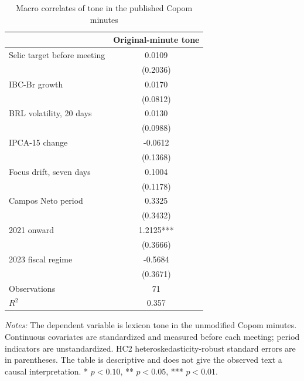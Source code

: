 \begin{table}[htbp]
\color{revisionred}
\centering
\begin{threeparttable}
\caption{Macro correlates of tone in the published Copom minutes}
\label{tab:macro-tone-correlates}
\begin{footnotesize}
\begin{tabular}{lc}
\toprule
 & Original-minute tone \\
\midrule
Selic target before meeting & 0.0109 \\
 & (0.2036) \\
IBC-Br growth & 0.0170 \\
 & (0.0812) \\
BRL volatility, 20 days & 0.0130 \\
 & (0.0988) \\
IPCA-15 change & -0.0612 \\
 & (0.1368) \\
Focus drift, seven days & 0.1004 \\
 & (0.1178) \\
Campos Neto period & 0.3325 \\
 & (0.3432) \\
2021 onward & 1.2125*** \\
 & (0.3666) \\
2023 fiscal regime & -0.5684 \\
 & (0.3671) \\
\midrule
Observations & 71 \\
$R^2$ & 0.357 \\
\bottomrule
\end{tabular}
\begin{tablenotes}[flushleft]
\scriptsize
\item \textit{Notes:} The dependent variable is lexicon tone in the unmodified Copom minutes. Continuous covariates are standardized and measured before each meeting; period indicators are unstandardized. HC2 heteroskedasticity-robust standard errors are in parentheses. The table is descriptive and does not give the observed text a causal interpretation. * $p<0.10$, ** $p<0.05$, *** $p<0.01$.
\end{tablenotes}
\end{footnotesize}
\end{threeparttable}
\end{table}
